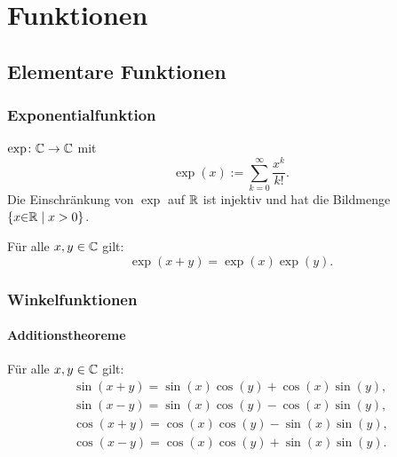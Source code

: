 
\chapter{Funktionen}
\section{Elementare Funktionen}
\subsection{Exponentialfunktion}
 $\exp\colon\mathbb C\to\mathbb C$ mit
\begin{equation}
\exp(x) := \sum_{k=0}^{\infty} \frac{x^k}{k!}.
\end{equation}
Die Einschränkung von $\exp$ auf $\mathbb R$ ist injektiv und
hat die Bildmenge $\{x{\in}\mathbb R\mid x>0\}$.

Für alle $x,y\in\mathbb C$ gilt:
\begin{equation}
\exp(x+y) = \exp(x)\exp(y).
\end{equation}

\subsection{Winkelfunktionen}
\subsubsection{Additionstheoreme}

Für alle $x,y\in\mathbb C$ gilt:
\begin{gather}
\sin(x+y) = \sin(x)\cos(y)+\cos(x)\sin(y),\\
\sin(x-y) = \sin(x)\cos(y)-\cos(x)\sin(y),\\
\cos(x+y) = \cos(x)\cos(y)-\sin(x)\sin(y),\\
\cos(x-y) = \cos(x)\cos(y)+\sin(x)\sin(y).
\end{gather}
